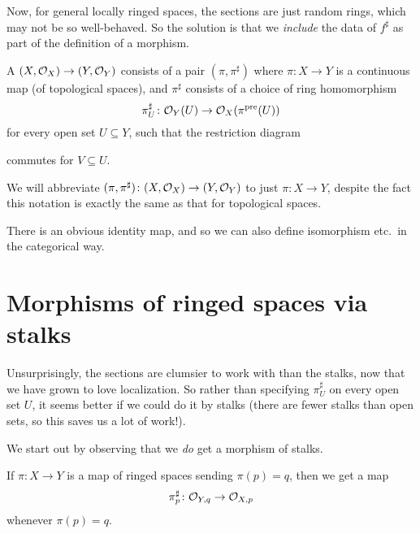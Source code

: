 Now, for general locally ringed spaces,
the sections are just random rings,
which may not be so well-behaved.
So the solution is that we \emph{include} the data of $f^\sharp$
as part of the definition of a morphism.
\begin{definition}
	A 
	$(X, \mathcal O_X) \to (Y, \mathcal O_Y)$ consists of a pair $(\pi, \pi^\sharp)$
	where $\pi \colon X \to Y$ is a continuous map
	(of topological spaces),
	and $\pi^\sharp$ consists of a choice of ring homomorphism
	\[ \pi^\sharp_U \colon \mathcal O_Y(U) \to \mathcal O_X(\pi^{\text{pre}}(U)) \]
	for every open set $U \subseteq Y$, such that the restriction diagram
	\begin{center}
	\end{center}
	commutes for $V \subseteq U$.
\end{definition}
\begin{abuse}
	We will abbreviate $(\pi, \pi^\sharp) \colon (X, \mathcal O_X) \to (Y, \mathcal O_Y)$
	to just $\pi \colon X \to Y$,
	despite the fact this notation is exactly
	the same as that for topological spaces.
\end{abuse}

There is an obvious identity map,
and so we can also define isomorphism etc.\ in the categorical way.

\section{Morphisms of ringed spaces via stalks}
Unsurprisingly, the sections are clumsier to work with
than the stalks, now that we have grown to love localization.
So rather than specifying $\pi^\sharp_U$ on every open set $U$,
it seems better if we could do it by stalks
(there are fewer stalks than open sets,
so this saves us a lot of work!).

We start out by observing that we \emph{do}
get a morphism of stalks.
\begin{proposition}
	If $\pi \colon X \to Y$ is a map of ringed spaces
	sending $\pi(p) = q$, then we get a map
	\[ \pi_p^\sharp \colon \mathcal O_{Y,q} \to \mathcal O_{X,p} \]
	whenever $\pi(p) = q$.
\end{proposition}

